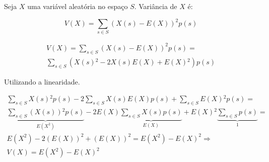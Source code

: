 \item
  Seja $X$ uma variável aleatória no espaço $S$. Variância de $X$ é:

  \[V(X) = \sum\limits_{s \in S} {{{\left( {X(s) - E(X)} \right)}^2}p(s)} \]

  \[\begin{array}{l}
  V(X) = \sum\limits_{s \in S} {{{\left( {X(s) - E(X)} \right)}^2}p(s)}  = \\
  \sum\limits_{s \in S} {\left( {X(s){^2} - 2X(s)E(X) + E(X){^2}} \right)p(s)}
  \end{array}\]

  Utilizando a linearidade.

  \[\begin{array}{l}
  \sum\limits_{s \in S} {X(s){^2}p(s)}  - 2\sum\limits_{s \in S} {X(s)E(X)p(s)}  + \sum\limits_{s \in S} {E(X){^2}p(s)}  = \\
  \underbrace {\sum\limits_{s \in S} {\left( {X(s)} \right){^2}p(s)} }_{E({X^2})} - 2E(X)\underbrace {\sum\limits_{s \in S} {X(s)p(s)} }_{E(X)} + E(X){^2}\underbrace {\sum\limits_{s \in S} {p(s)} }_1 = \\
  E({X^2}) - 2{\left( {E(X)} \right)^2} + {\left( {E(X)} \right)^2} = E({X^2}) - E{(X)^2} \Rightarrow \\
  V(X) = E({X^2}) - E{(X)^2}
  \end{array}\]
